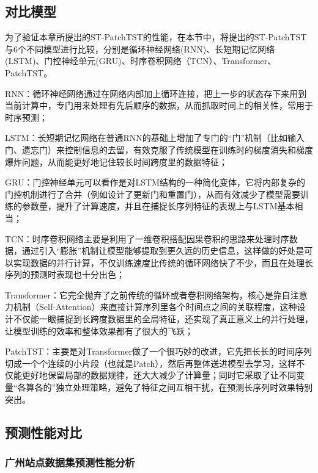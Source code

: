 \subsection{对比模型}


为了验证本章所提出的ST-PatchTST的性能，在本节中，将提出的ST-PatchTST与6个不同模型进行比较，分别是循环神经网络(RNN)、长短期记忆网络(LSTM)、门控神经单元(GRU)、时序卷积网络（TCN）、Transformer、PatchTST。


RNN\cite{[3]}：循环神经网络通过在网络内部加上循环连接，把上一步的状态存下来用到当前计算中，专门用来处理有先后顺序的数据，从而抓取时间上的相关性，常用于时序预测；

LSTM\cite{[4]}：长短期记忆网络在普通RNN的基础上增加了专门的“门”机制（比如输入门、遗忘门）来控制信息的去留，有效克服了传统模型在训练时的梯度消失和梯度爆炸问题，从而能更好地记住较长时间跨度里的数据特征；

GRU\cite{[5]}：门控神经单元可以看作是对LSTM结构的一种简化变体，它将内部复杂的门控机制进行了合并（例如设计了更新门和重置门），从而有效减少了模型需要训练的参数量，提升了计算速度，并且在捕捉长序列特征的表现上与LSTM基本相当；

TCN\cite{[6]}：时序卷积网络主要是利用了一维卷积搭配因果卷积的思路来处理时序数据，通过引入“膨胀”机制让模型能够提取到更久远的历史信息，这样做的好处是可以实现数据的并行计算，不仅训练速度比传统的循环网络快了不少，而且在处理长序列的预测时表现也十分出色；

Transformer\cite{[7]}：它完全抛弃了之前传统的循环或者卷积网络架构，核心是靠自注意力机制（Self-Attention）来直接计算序列里各个时间点之间的关联程度，这种设计不仅能一眼捕捉到长跨度数据里的全局特征，还实现了真正意义上的并行处理，让模型训练的效率和整体效果都有了很大的飞跃；

PatchTST\cite{[2]}：主要是对Transformer做了一个很巧妙的改进，它先把长长的时间序列切成一个个连续的小片段（也就是Patch），然后再整体送进模型去学习，这样不仅能更好地保留局部的数据规律，还大大减少了计算量；同时它采取了让不同变量“各算各的”独立处理策略，避免了特征之间互相干扰，在预测长序列时效果特别突出。

\subsection{预测性能对比}

\subsubsection{广州站点数据集预测性能分析}

